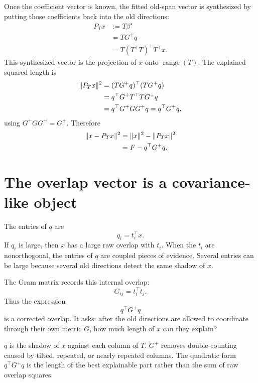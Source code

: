 \documentclass[10pt,twocolumn]{article}
\newcommand{\range}{\operatorname{range}}
\begin{document}
Once the coefficient vector is known, the fitted old-span vector is synthesized by putting those coefficients back into the old directions:
\begin{equation}
\begin{aligned}
P_Tx
&:=T\beta^\star\\
&=TG^+q\\
&=T(T^\top T)^+T^\top x.
\end{aligned}
\label{eq:projector_form}
\end{equation}
This synthesized vector is the projection of \(x\) onto \(\range(T)\).
The explained squared length is
\begin{align}
\|P_Tx\|^2
&=(TG^+q)^\top(TG^+q)\notag\\
&=q^\top G^+T^\top T G^+q\notag\\
&=q^\top G^+GG^+q
=q^\top G^+q,
\label{eq:explained_length}
\end{align}
using $G^+GG^+=G^+$. Therefore
\begin{align}
\|x-P_Tx\|^2
&=\|x\|^2-\|P_Tx\|^2\notag\\
&=F-q^\top G^+q.
\label{eq:residual_derivation_short}
\end{align}

\section{The overlap vector is a covariance-like object}

The entries of $q$ are
\begin{equation}
q_i=t_i^\top x.
\label{eq:q_entries}
\end{equation}
If $q_i$ is large, then $x$ has a large raw overlap with $t_i$. When the $t_i$ are nonorthogonal, the entries of $q$ are coupled pieces of evidence. Several entries can be large because several old directions detect the same shadow of $x$.

The Gram matrix records this internal overlap:
\begin{equation}
G_{ij}=t_i^\top t_j.
\label{eq:G_entries}
\end{equation}
Thus the expression
\begin{equation}
q^\top G^+q
\label{eq:qGq}
\end{equation}
is a corrected overlap. It asks: after the old directions are allowed to coordinate through their own metric $G$, how much length of $x$ can they explain?

\begin{intuitionbox}
$q$ is the shadow of $x$ against each column of $T$. $G^+$ removes double-counting caused by tilted, repeated, or nearly repeated columns. The quadratic form $q^\top G^+q$ is the length of the best explainable part rather than the sum of raw overlap squares.
\end{intuitionbox}
\end{document}
